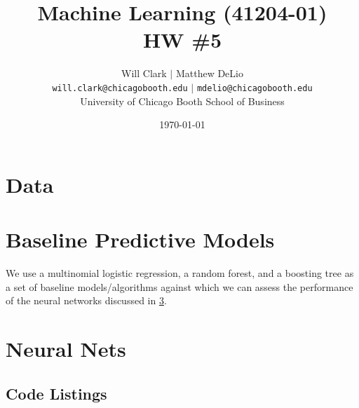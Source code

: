 



\title{Machine Learning (41204-01)\\HW \#5}
\author{Will Clark $\vert$ Matthew DeLio \\
\texttt{will.clark@chicagobooth.edu} $\vert$ \texttt{mdelio@chicagobooth.edu} \\
University of Chicago Booth School of Business}
\date{\today}
\maketitle

\section{Data}

\section{Baseline Predictive Models} \label{baseline}

We use a multinomial logistic regression, a random forest, and a boosting tree as a set of baseline models/algorithms against which we can assess the performance of the neural networks discussed in \cref{nnets}.

\section{Neural Nets} \label{nnets}

\clearpage
\begin{appendices}
\section{Code Listings}

\end{appendices}



% 



